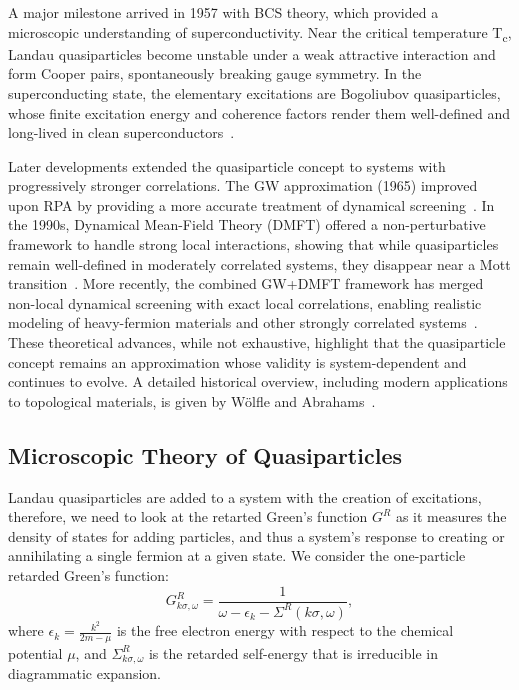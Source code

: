 A major milestone arrived in 1957 with BCS theory, which provided a microscopic understanding of superconductivity. Near the critical temperature T\textsubscript{c}, Landau quasiparticles become unstable under a weak attractive interaction and form Cooper pairs, spontaneously breaking gauge symmetry. In the superconducting state, the elementary excitations are Bogoliubov quasiparticles, whose finite excitation energy and coherence factors render them well-defined and long-lived in clean superconductors~\cite{cooperBoundElectronPairs1956,bardeenTheorySuperconductivity1957,tinkhamIntroductionSuperconductivity2004}.

Later developments extended the quasiparticle concept to systems with progressively stronger correlations. The GW approximation (1965) improved upon RPA by providing a more accurate treatment of dynamical screening~\cite{hedinNewMethodCalculating1965,aryasetiawanGWMethod1998}. In the 1990s, Dynamical Mean-Field Theory (DMFT) offered a non-perturbative framework to handle strong local interactions, showing that while quasiparticles remain well-defined in moderately correlated systems, they disappear near a Mott transition~\cite{metznerCorrelatedLatticeFermions1989,georgesDynamicalMeanfieldTheory1996}. More recently, the combined GW+DMFT framework has merged non-local dynamical screening with exact local correlations, enabling realistic modeling of heavy-fermion materials and other strongly correlated systems~\cite{biermannFirstprinciplesApproachElectronic2003}. These theoretical advances, while not exhaustive, highlight that the quasiparticle concept remains an approximation whose validity is system-dependent and continues to evolve. A detailed historical overview, including modern applications to topological materials, is given by Wölfle and Abrahams~\cite{wolfleQuasiparticlesCondensedMatter2018}.

\subsection{Microscopic Theory of Quasiparticles}
Landau quasiparticles are added to a system with the creation of excitations, therefore, we need to look at the retarted Green's function $G^R$ as it measures the density of states for adding particles, and thus a system's response to creating or annihilating a single fermion at a given state. We consider the one-particle retarded Green's function: 
\begin{equation}\label{retardedgreen}
	G^R_{k \sigma, \omega} = \frac{1}{\omega -\epsilon_k - \Sigma^R(k \sigma, \omega)},
\end{equation}
where $\epsilon_k= \frac{k^2}{2m-\mu}$ is the free electron energy with respect to the chemical potential $\mu$, and $\Sigma^R_{k \sigma, \omega}$ is the retarded self-energy that is irreducible in diagrammatic expansion. 

